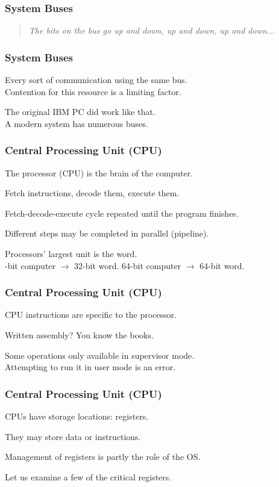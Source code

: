 \begin{frame}
\frametitle{System Buses}

\begin{quote}
	\textit{The bits on the bus go up and down, up and down, up and down...}
\end{quote}


\end{frame}

\begin{frame}
\frametitle{System Buses}

Every sort of communication using the same bus.\\
\quad Contention for this resource is a limiting factor. 

The original IBM PC did work like that.\\
\quad A modern system has numerous buses.

\end{frame}

\begin{frame}
\frametitle{Central Processing Unit (CPU)}

The processor (CPU) is the brain of the computer.

Fetch instructions, decode them, execute them.

Fetch-decode-execute cycle repeated until the program finishes.

Different steps may be completed in parallel (\alert{pipeline}).

Processors' largest unit is the \alert{word}.\\
-bit computer $\rightarrow$ 32-bit word. 64-bit computer $\rightarrow$ 64-bit word.

\end{frame}

\begin{frame}
\frametitle{Central Processing Unit (CPU)}
CPU instructions are specific to the processor.

Written assembly? You know the books.

Some operations only available in supervisor mode.\\
\quad Attempting to run it in user mode is an error.


\end{frame}

\begin{frame}
\frametitle{Central Processing Unit (CPU)}
CPUs have storage locations: \alert{registers}.

They may store data or instructions.

Management of registers is partly the role of the OS.

Let us examine a few of the critical registers.

\end{frame}

